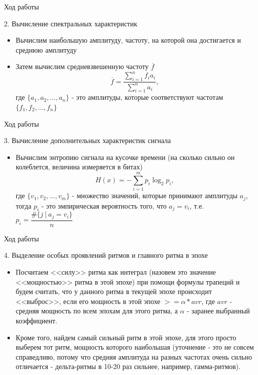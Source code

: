 \documentclass[10pt, red]{beamer}
\begin{document}
\begin{frame}{Ход работы}

2. Вычисление спектральных характеристик
\begin{itemize}
    \item Вычислим наибольшую амплитуду, частоту, на которой она достигается и среднюю амплитуду
    \item Затем вычислим средневзвешенную частоту $\overline{f}$
    $$
        \overline{f} = \frac{\sum\limits_{i = 1}^{n} f_i a_i}{\sum\limits_{i = 1}^{n} a_i},
    $$
    где $\{a_1, a_2, \ldots, a_n\}$ - это амплитуды, которые соответствуют частотам $\{f_1, f_2, \ldots, f_n\}$
\end{itemize}
    
\end{frame}

\begin{frame}{Ход работы}

3. Вычисление дополнительных характеристик сигнала
\begin{itemize}
    \item Вычислим энтропию сигнала на кусочке времени (на сколько сильно он колеблется, величина измеряется в битах)
    $$
        H(x) = - \sum\limits_{i=1}^{m} p_i \log_2 p_i,
    $$
    где $\{v_1, v_2, \ldots, v_m\}$ - множество значений, которые принимают амплитуды $a_j$, тогда $p_i$ - это эмпирическая вероятность того, что $a_j = v_i$, т.е. $p_i = \dfrac{\text{#} \{j \ | \ a_j = v_i\}}{n}$
\end{itemize}
    
\end{frame}

\begin{frame}{Ход работы}

4. Выделение особых проявлений ритмов и главного ритма в эпохе
\begin{itemize}
    \item Посчитаем <<силу>> ритма как интеграл (назовем это значение <<мощностью>> ритма в этой эпохе) при помощи формулы трапеций и будем считать, что у данного ритма в текущей эпохе происходит <<выброс>>, если его мощность в этой эпохе $>= \alpha * avr$, где $avr$ - средняя мощность по всем эпохам для этого ритма, а $\alpha$ - заранее выбранный коэффициент.
    \item Кроме того, найдем самый сильный ритм в этой эпохе, для этого просто выберем тот ритм, мощность которого наибольшая (уточнение - это не совсем справедливо, потому что средняя амплитуда на разных частотах очень сильно отличается - дельта-ритмы в 10-20 раз сильнее, например, гамма-ритмов).
\end{itemize}

\end{frame}
\end{document}

